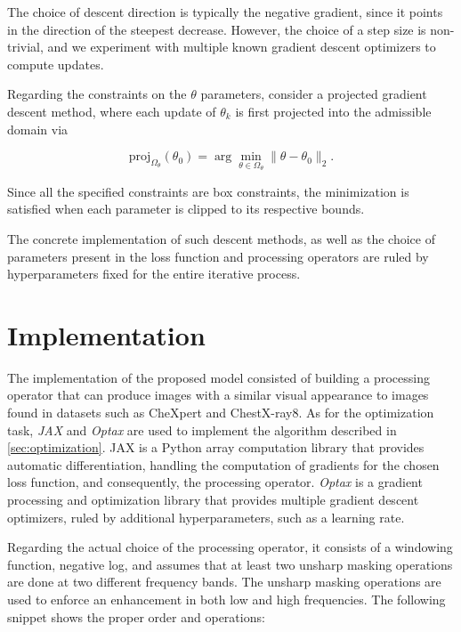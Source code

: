 \documentclass[nomenclature, english, bibtex]{kththesis}
\numberwithin{listing}{chapter}
\begin{document}
The choice of descent direction is typically the negative gradient, since it points in the direction of the steepest
decrease. However, the choice of a step size is non-trivial, and we experiment with multiple known gradient descent
optimizers to compute updates.

Regarding the constraints on the $\theta$ parameters, consider a projected gradient descent method, where
each update of  $\theta_k$ is first projected into the admissible domain via

\begin{equation}
    \mathrm{proj}_{\Omega_\theta}(\theta_0) = \arg\min_{\theta \in \Omega_\theta} \lVert \theta - \theta_0 \rVert_2.
\end{equation}

Since all the specified constraints are box constraints, the minimization is satisfied when each parameter is
clipped to its respective bounds.

The concrete implementation of such descent methods, as well as the choice of parameters present in the loss function
and processing operators are ruled by hyperparameters fixed for the entire iterative process.

\chapter{Implementation}

The implementation of the proposed model consisted of building a processing operator that can produce images with a similar
visual appearance to images found in datasets such as CheXpert and ChestX-ray8. As for the optimization task,
\textit{JAX} \cite{jax2018github} and \textit{Optax} \cite{deepmind2020jax} are used to implement the
algorithm described in \autoref{sec:optimization}. JAX is a Python array computation library that provides automatic
differentiation, handling the computation of gradients for the chosen loss function, and consequently, the processing
operator. \textit{Optax} is a gradient processing and optimization library that provides multiple gradient descent optimizers, ruled
by additional hyperparameters, such as a learning rate.


Regarding the actual choice of the processing operator, it consists of a windowing function,
negative log, and assumes that at least two unsharp masking operations are done at two different
frequency bands. The unsharp masking operations are used to enforce an enhancement in both
low and high frequencies. The following snippet shows the proper order and operations:
\end{document}
